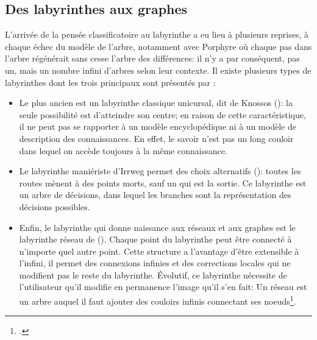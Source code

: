 \subsection{\label{III-A-1-b}Des labyrinthes aux graphes}

L'arrivée de la pensée classificatoire au labyrinthe a eu lieu à plusieurs reprises, à chaque échec du modèle de l'arbre, notamment avec Porphyre où chaque pas dans l'arbre régénérait sans cesse l'arbre des différences: il n'y a par conséquent, pas un, mais un nombre infini d'arbres selon leur contexte. Il existe plusieurs types de labyrinthes dont les trois principaux sont présentés par :
\begin{itemize}
	\item Le plus ancien est un labyrinthe classique unicursal, dit de Knossos (): la seule possibilité est d'atteindre son centre; en raison de cette caractéristique, il ne peut pas se rapporter à un modèle encyclopédique ni à un modèle de description des connaissances. En effet, le savoir n'est pas un long couloir dans lequel on accède toujours à la même connaissance.
	\item Le labyrinthe maniériste d'Irrweg permet des choix alternatifs (): toutes les routes mènent à des points morts, sauf un qui est la sortie. Ce labyrinthe est un arbre de décisions, dans lequel les branches sont la représentation des décisions possibles.
	\item Enfin, le labyrinthe qui donne naissance aux réseaux et aux graphes est le \og labyrinthe réseau\fg{} de  (). Chaque point du labyrinthe peut être connecté à n'importe quel autre point. Cette structure a l'avantage d'être extensible à l'infini, il permet des connexions infinies et des corrections locales qui ne modifient pas le reste du labyrinthe. Évolutif, ce labyrinthe nécessite de l'utilisateur qu'il modifie en permanence l'image qu'il s'en fait: \og Un réseau est un arbre auquel il faut ajouter des couloirs infinis connectant ses noeuds\fg{}\footcite{eco_arbre_2010}.
\end{itemize}
\medskip
